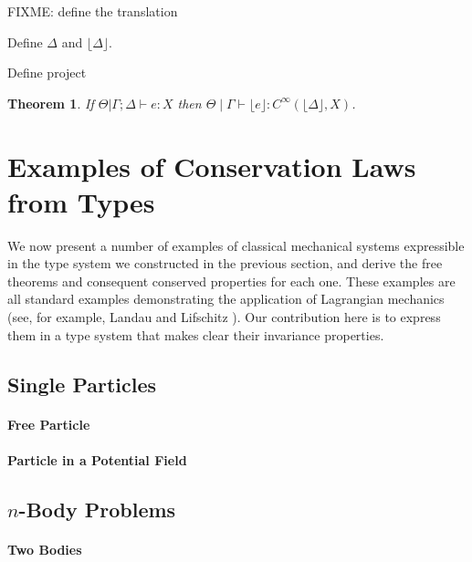 \documentclass[preprint]{sigplanconf}
\newcommand{\sepbar}{\mathrel|}
\newtheorem{theorem}{Theorem}
\newcommand{\elab}[1]{\lfloor #1 \rfloor}
\theoremstyle{examplestyle}
\begin{document}
FIXME: define the translation

Define $\Delta$ and $\elab{\Delta}$.

Define project

\begin{theorem}
  If $\Theta |\Gamma; \Delta \vdash e : X$ then $\Theta \sepbar
  \Gamma \vdash \elab{e} : C^\infty(\elab{\Delta}, X)$.
\end{theorem}

\section{Examples of Conservation Laws from Types}
\label{sec:examples}

We now present a number of examples of classical mechanical systems
expressible in the type system we constructed in the previous section,
and derive the free theorems and consequent conserved properties for
each one. These examples are all standard examples demonstrating the
application of Lagrangian mechanics (see, for example, Landau and
Lifschitz \cite{landau60mechanics}). Our contribution here is to
express them in a type system that makes clear their invariance
properties.

\subsection{Single Particles}


\paragraph{Free Particle}

\paragraph{Particle in a Potential Field}

\subsection{$n$-Body Problems}

\paragraph{Two Bodies}
\end{document}
